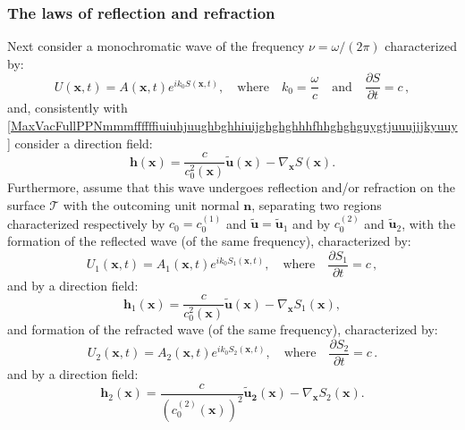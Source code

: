 \documentclass{article}
\theoremstyle{definition}
\theoremstyle{remark}
\renewcommand{\vec}[1]{\mathbf{#1}}
\newcommand{\er}{\eqref}
\newcommand{\er}{\eqref}
\begin{document}
\subsubsection{The laws of reflection and refraction}\label{rrGO}
Next consider a
monochromatic wave of the frequency $\nu=\omega/(2\pi)$
characterized by:
\begin{equation}\label{MaxVacFullPPNmmmffffffiuiuhjuughbghhuiiujjhhjjhjhhj}
U(\vec x,t)=A(\vec x,t)e^{ik_0S(\vec x,t)},\quad\text{where}\quad
k_0=\frac{\omega}{c}\quad\text{and}\quad\frac{\partial S}{\partial
t}=c\,,
\end{equation}
and, consistently with
\er{MaxVacFullPPNmmmffffffiuiuhjuughbghhiuijghghghhhfhhghghguygtjuuujjjkyuuy}
consider a direction field:
\begin{equation}\label{MaxVacFullPPNmmmffffffiuiuhjuughbghhiuijghghghhhfhhghghguygtjuuujjjkyuuykjkjj}
\vec h(\vec x)=\frac{c}{c^2_0(\vec x)}\vec {\tilde u}(\vec
x)-\nabla_{\vec x}S(\vec x).
\end{equation}
Furthermore, assume that this wave undergoes reflection and/or
refraction on the surface $\mathcal{T}$ with the outcoming unit
normal $\vec n$, separating two regions characterized respectively
by $c_0=c^{(1)}_0$ and $\vec {\tilde u}=\vec {\tilde u}_1$ and by
$c^{(2)}_0$ and $\vec {\tilde u}_2$, with the formation of the
reflected wave (of the same frequency), characterized by:
\begin{equation}\label{MaxVacFullPPNmmmffffffiuiuhjuughbghhuiiujjhhjjhjhhjugh}
U_1(\vec x,t)=A_1(\vec x,t)e^{ik_0S_1(\vec
x,t)},\quad\text{where}\quad\frac{\partial S_1}{\partial t}=c\,,
\end{equation}
and by a direction field:
\begin{equation}\label{MaxVacFullPPNmmmffffffiuiuhjuughbghhiuijghghghhhfhhghghguygtjuuujjjkyuuykjkjjhjhhj}
\vec h_1(\vec x)=\frac{c}{c^2_0(\vec x)}\vec {\tilde u}(\vec
x)-\nabla_{\vec x}S_1(\vec x),
\end{equation}
and formation of the refracted wave (of the same frequency),
characterized by:
\begin{equation}\label{MaxVacFullPPNmmmffffffiuiuhjuughbghhuiiujjhhjjhjhhj1}
U_2(\vec x,t)=A_2(\vec x,t)e^{ik_0S_2(\vec
x,t)},\quad\text{where}\quad\frac{\partial S_2}{\partial t}=c\,.
\end{equation}
and by a direction field:
\begin{equation}\label{MaxVacFullPPNmmmffffffiuiuhjuughbghhiuijghghghhhfhhghghguygtjuuujjjkyuuykjkjj1}
\vec h_2(\vec x)=\frac{c}{\left(c^{(2)}_0(\vec x)\right)^2}\vec
{\tilde u_2}(\vec x)-\nabla_{\vec x}S_2(\vec x).
\end{equation}
\end{document}
